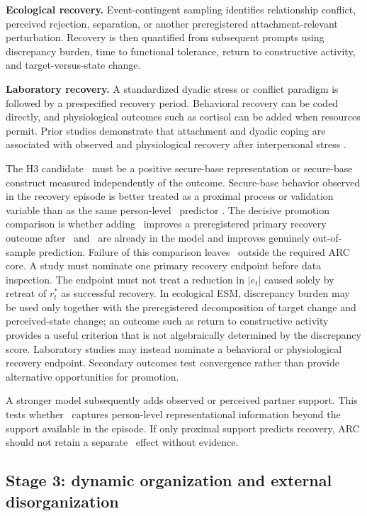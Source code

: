 \textbf{Ecological recovery.} Event-contingent sampling identifies relationship conflict, perceived rejection, separation, or another preregistered attachment-relevant perturbation. Recovery is then quantified from subsequent prompts using discrepancy burden, time to functional tolerance, return to constructive activity, and target-versus-state change.

\textbf{Laboratory recovery.} A standardized dyadic stress or conflict paradigm is followed by a prespecified recovery period. Behavioral recovery can be coded directly, and physiological outcomes such as cortisol can be added when resources permit. Prior studies demonstrate that attachment and dyadic coping are associated with observed and physiological recovery after interpersonal stress \parencite{powers2006cortisol,meuwly2012cortisol,salvatore2011recovery}.

The H3 candidate \Sec\ must be a positive secure-base representation or secure-base construct measured independently of the outcome. Secure-base behavior observed in the recovery episode is better treated as a proximal process or validation variable than as the same person-level \Sec\ predictor \parencite{crowell2002securebase}. The decisive promotion comparison is whether adding \Sec\ improves a preregistered primary recovery outcome after \Anx\ and \Avo\ are already in the model and improves genuinely out-of-sample prediction. Failure of this comparison leaves \Sec\ outside the required ARC core. A study must nominate one primary recovery endpoint before data inspection. The endpoint must not treat a reduction in \(|e_t|\) caused solely by retreat of \(r_t^\ast\) as successful recovery. In ecological ESM, discrepancy burden may be used only together with the preregistered decomposition of target change and perceived-state change; an outcome such as return to constructive activity provides a useful criterion that is not algebraically determined by the discrepancy score. Laboratory studies may instead nominate a behavioral or physiological recovery endpoint. Secondary outcomes test convergence rather than provide alternative opportunities for promotion.

A stronger model subsequently adds observed or perceived partner support. This tests whether \Sec\ captures person-level representational information beyond the support available in the episode. If only proximal support predicts recovery, ARC should not retain a separate \Sec\ effect without evidence.

\subsection{Stage 3: dynamic organization and external disorganization}

